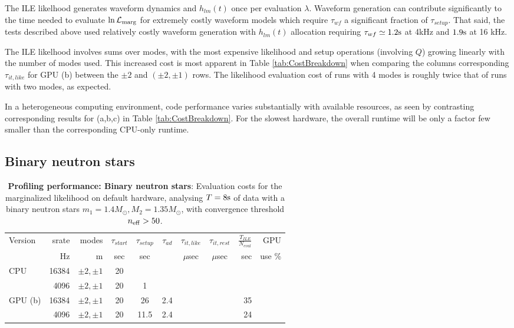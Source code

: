 \documentclass[twocolumn,prd,nofootinbib]{revtex4}
\newcommand\unit[1]{{\rm #1}}
\newcommand\ILE{ILE}
\begin{document}
The \ILE{} likelhood  generates waveform dynamics and $h_{lm}(t)$ once per evaluation $\lambda$.   Waveform generation can contribute significantly to the
time needed to evaluate  $\ln {\cal L}_{\rm marg}$ for extremely costly
waveform models which require $\tau_{wf} $ a significant fraction of $  \tau_{setup}$.   That said, the tests described
above used relatively costly waveform generation with $h_{lm}(t)$ allocation requiring $\tau_{wf} \simeq 1.2 \unit{s}$
at 4kHz and $1.9\unit{s}$ at 16 kHz.

The \ILE{} likelhood involves sums over modes, with the most expensive likelihood and setup operations (involving $Q$) growing linearly with
the number of modes used.  This increased cost is most apparent in Table \ref{tab:CostBreakdown} when comparing the
columns corresponding  $\tau_{it,like}$ for GPU (b) between the $\pm 2$ and $(\pm 2,\pm 1)$ rows.  The likelihood
evaluation cost of runs with 4 modes is roughly twice that of runs with two modes, as expected. 

In a heterogeneous computing environment, code performance varies substantially with available resources, as seen by
contrasting corresponding results for (a,b,c) in Table \ref{tab:CostBreakdown}.      For
the slowest hardware,  the overall runtime will be only a factor few smaller than the corresponding CPU-only runtime.


\subsection{Binary neutron stars}
\begin{table*}
\begin{tabular}{lrr|ccccc|rr}
Version & srate & modes & $\tau_{start}$ & $\tau_{setup}$ & $\tau_{ad}$ & $\tau_{it,like}$ &$\tau_{it,rest}$ &
$\frac{T_{ILE}}{N_{eval}}$ & GPU \\  %
  &   Hz & m & sec & sec & & $\mu$sec & $\mu$sec  &sec  & use  \%\\ \hline 
CPU & 16384 & $\pm 2,\pm 1 $ & 20 &  &&  & &    \\ 
       & 4096 & $\pm 2, \pm 1$ & 20 & 1&&   &&  & \\ \hline
GPU (b) & 16384 & $\pm 2, \pm 1$   & 20 & 26 & 2.4 && &35 &  \\
       & 4096 & $ \pm 2, \pm 1 $        &   20  & 11.5 & 2.4 & & &24 & \\ \hline
\end{tabular}
\caption{\label{tab:CostBreakdown:BNS}\textbf{Profiling performance: Binary neutron stars}: Evaluation costs for the
  marginalized likelihood on default
  hardware,  analysing $T=8\unit{s}$ of data with a binary neutron stars
  $m_1=1.4 M_\odot,M_2=1.35 M_\odot$, with convergence threshold $n_{\rm eff} > 50$.
}
\end{table*}
\end{document}
